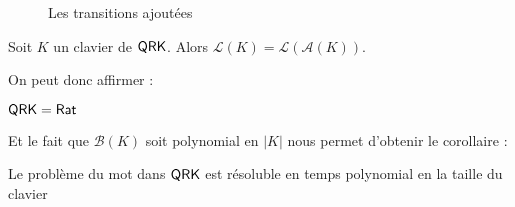 \documentclass[12pt, a4paper]{article}
\renewcommand{\L}{\mathcal{L}}
\newcommand{\A}{\mathcal{A}}
\begin{document}
\begin{figure}[!ht]
{
        }
        \caption{Les transitions ajoutées}
        \label{ok}
    \end{figure}
    \begin{bisimautomclav}\label{lklak}
        Soit $K$ un clavier de $\mathsf{QRK}$. Alors $\L(K) = \L(\A(K))$.
    \end{bisimautomclav}
    On peut donc affirmer :
    \begin{QRKegalRat}
        $\mathsf{QRK} = \mathsf{Rat}$
    \end{QRKegalRat}
    Et le fait que $\mathcal{B}(K)$ soit polynomial en $|K|$ nous permet d'obtenir le corollaire :
    \begin{motQRK}
        Le problème du mot dans $\mathsf{QRK}$ est résoluble en temps polynomial en la taille du clavier
    \end{motQRK}
    
    \clearpage


    \appendix
\end{document}
